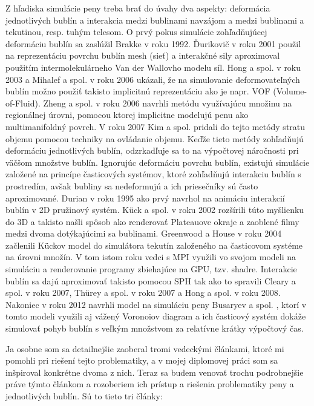 Z hľadiska simulácie peny treba brať do úvahy dva aspekty: deformácia jednotlivých bublín a interakcia medzi bublinami navzájom a medzi bublinami a tekutinou, resp. tuhým telesom. O prvý pokus simulácie zohľadňujúcej deformáciu bublín sa zaslúžil Brakke \cite{brakke1992} v roku 1992. Ďurikovič \cite{durikovic2001} v roku 2001 použil na reprezentáciu povrchu bublín mesh (sieť) a interakčné sily aproximoval použitím intermolekulárneho Van der Wallovho modelu síl. Hong a spol. \cite{hong2003} v roku 2003 a Mihalef a spol. \cite{mihalef2006} v roku 2006 ukázali, že na simulovanie deformovateľných bublín možno použiť takisto implicitnú reprezentáciu ako je napr. VOF (Volume-of-Fluid). Zheng a spol. \cite{zheng2006} v roku 2006 navrhli metódu využívajúcu množinu na regionálnej úrovni, pomocou ktorej implicitne modelujú penu ako multimanifoldný povrch. V roku 2007 Kim a spol. \cite{kim2007} pridali do tejto metódy stratu objemu pomocou techniky na ovládanie objemu. Keďže tieto metódy zohľadňujú deformáciu jednotlivých bublín, odzrkadľuje sa to na výpočtovej náročnosti pri väčšom množstve bublín. Ignorujúc deformáciu povrchu bublín, existujú simulácie založené na princípe časticových systémov, ktoré zohľadňujú interakciu bublín s prostredím, avšak bubliny sa nedeformujú a ich priesečníky sú často aproximované. Durian \cite{durian1995} v roku 1995 ako prvý navrhol na animáciu interakcií bublín v 2D pružinový systém. Kück a spol. \cite{kueck2002} v roku 2002 rozšírili túto myšlienku do 3D a takisto našli spôsob ako renderovať Plateauove okraje a zaoblené filmy medzi dvoma dotýkajúcimi sa bublinami. Greenwood a House \cite{greenwood2004} v roku 2004 začlenili Kückov model do simulátora tekutín založeného na časticovom systéme na úrovni množín. V tom istom roku vedci s MPI \cite{sunkel2004} využili vo svojom modeli na simuláciu a renderovanie programy zbiehajúce na GPU, tzv. shadre. Interakcie bublín sa dajú aproximovať takisto pomocou SPH tak ako to spravili Cleary a spol. \cite{cleary2007} v roku 2007, Thürey a spol. \cite{thurey2007} v roku 2007 a Hong a spol. \cite{hong2008} v roku 2008. Nakoniec v roku 2012 navrhli model na simuláciu peny Busaryev a spol. \cite{busaryev2012}, ktorí v tomto modeli využili aj vážený Voronoiov diagram a ich časticový systém dokáže simulovať pohyb bublín s veľkým množstvom za relatívne krátky výpočtový čas.

Ja osobne som sa detailnejšie zaoberal tromi vedeckými článkami, ktoré mi pomohli pri riešení tejto problematiky, a v mojej diplomovej práci som sa inšpiroval konkrétne dvoma z nich. Teraz sa budem venovať trochu podrobnejšie práve týmto článkom a rozoberiem ich prístup a riešenia problematiky peny a jednotlivých bublín. Sú to tieto tri články:

